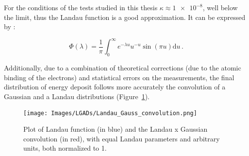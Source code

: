 For the conditions of the tests studied in this thesis \(\kappa\approx \num{1e-8}\), well below the limit, thus the Landau function is a good approximation. It can be expressed by \cite{KOLBIG198497}:

\begin{equation}\label{eq:landau}
    \Phi (\lambda) = \frac{1}{\pi} \int_{0}^{\infty} e^{-\lambda u} u^{-u} \sin (\pi u ) \mathrm{d}u \, .
\end{equation}

Additionally, due to a combination of theoretical corrections \cite{PhysRevA.11.1286} (due to the atomic binding of the electrons) and statistical errors on the measurements, the final distribution of energy deposit follows more accurately the convolution of a Gaussian and a Landau distributions (Figure~\ref{fig:langau_convolution_plot}).

\begin{figure}
    \centering
    \texttt{[image: Images/LGADs/Landau\_Gauss\_convolution.png]}
    \captionsetup{width=\captionwidth}
    \caption{Plot of Landau function (in blue) and the Landau x Gaussian convolution (in red), with equal Landau parameters and arbitrary units, both normalized to 1.}
    \label{fig:langau_convolution_plot}
\end{figure}

